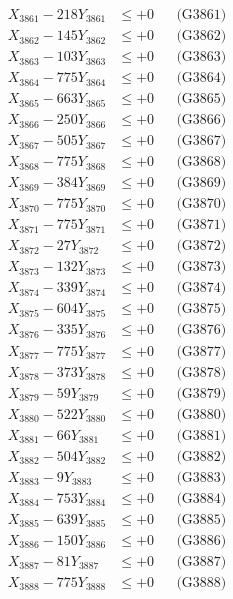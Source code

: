 \documentclass[a4paper,10pt]{article}
\begin{document}
{\begin{align}
\allowbreak
X_{3861} - 218Y_{3861} &\leq +0 && \text{(G3861)} \\
X_{3862} - 145Y_{3862} &\leq +0 && \text{(G3862)} \\
X_{3863} - 103Y_{3863} &\leq +0 && \text{(G3863)} \\
X_{3864} - 775Y_{3864} &\leq +0 && \text{(G3864)} \\
X_{3865} - 663Y_{3865} &\leq +0 && \text{(G3865)} \\
X_{3866} - 250Y_{3866} &\leq +0 && \text{(G3866)} \\
X_{3867} - 505Y_{3867} &\leq +0 && \text{(G3867)} \\
X_{3868} - 775Y_{3868} &\leq +0 && \text{(G3868)} \\
X_{3869} - 384Y_{3869} &\leq +0 && \text{(G3869)} \\
X_{3870} - 775Y_{3870} &\leq +0 && \text{(G3870)} \\
\allowbreak
X_{3871} - 775Y_{3871} &\leq +0 && \text{(G3871)} \\
X_{3872} - 27Y_{3872} &\leq +0 && \text{(G3872)} \\
X_{3873} - 132Y_{3873} &\leq +0 && \text{(G3873)} \\
X_{3874} - 339Y_{3874} &\leq +0 && \text{(G3874)} \\
X_{3875} - 604Y_{3875} &\leq +0 && \text{(G3875)} \\
X_{3876} - 335Y_{3876} &\leq +0 && \text{(G3876)} \\
X_{3877} - 775Y_{3877} &\leq +0 && \text{(G3877)} \\
X_{3878} - 373Y_{3878} &\leq +0 && \text{(G3878)} \\
X_{3879} - 59Y_{3879} &\leq +0 && \text{(G3879)} \\
X_{3880} - 522Y_{3880} &\leq +0 && \text{(G3880)} \\
\allowbreak
X_{3881} - 66Y_{3881} &\leq +0 && \text{(G3881)} \\
X_{3882} - 504Y_{3882} &\leq +0 && \text{(G3882)} \\
X_{3883} - 9Y_{3883} &\leq +0 && \text{(G3883)} \\
X_{3884} - 753Y_{3884} &\leq +0 && \text{(G3884)} \\
X_{3885} - 639Y_{3885} &\leq +0 && \text{(G3885)} \\
X_{3886} - 150Y_{3886} &\leq +0 && \text{(G3886)} \\
X_{3887} - 81Y_{3887} &\leq +0 && \text{(G3887)} \\
X_{3888} - 775Y_{3888} &\leq +0 && \text{(G3888)} \\

\end{align}}
\end{document}
